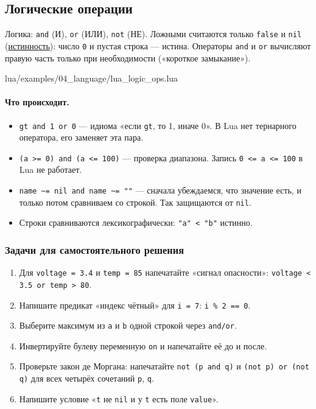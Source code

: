\subsection{Логические операции}

Логика: \verb|and| (И), \verb|or| (ИЛИ), \verb|not| (НЕ). Ложными считаются только \verb|false| и \verb|nil| (\hyperlink{term:truthiness}{истинность}): число \verb|0| и пустая строка --- истина. Операторы \verb|and| и \verb|or| вычисляют правую часть только при необходимости («короткое замыкание»).

\begin{codefile}{lua/examples/04_language/lua_logic_ops.lua}
\end{codefile}

\paragraph{Что происходит.}
\begin{itemize}
    \item \verb|gt and 1 or 0| --- идиома «если \verb|gt|, то 1, иначе 0». В Lua нет тернарного оператора, его заменяет эта пара.
    \item \verb|(a >= 0) and (a <= 100)| --- проверка диапазона. Запись \verb|0 <= a <= 100| в Lua не работает.
    \item \verb|name ~= nil and name ~= ""| --- сначала убеждаемся, что значение есть, и только потом сравниваем со строкой. Так защищаются от \verb|nil|.
    \item Строки сравниваются лексикографически: \verb|"a" < "b"| истинно.
\end{itemize}

\subsubsection*{Задачи для самостоятельного решения}
\begin{enumerate}
  \item Для \verb|voltage = 3.4| и \verb|temp = 85| напечатайте «сигнал опасности»: \verb|voltage < 3.5 or temp > 80|.
  \item Напишите предикат «индекс чётный» для \verb|i = 7|: \verb|i % 2 == 0|.
  \item Выберите максимум из \verb|a| и \verb|b| одной строкой через \verb|and/or|.
  \item Инвертируйте булеву переменную \verb|on| и напечатайте её до и после.
  \item Проверьте закон де Моргана: напечатайте \verb|not (p and q)| и \verb|(not p) or (not q)| для всех четырёх сочетаний \verb|p|, \verb|q|.
  \item Напишите условие «\verb|t| не \verb|nil| и у \verb|t| есть поле \verb|value|».
\end{enumerate}
